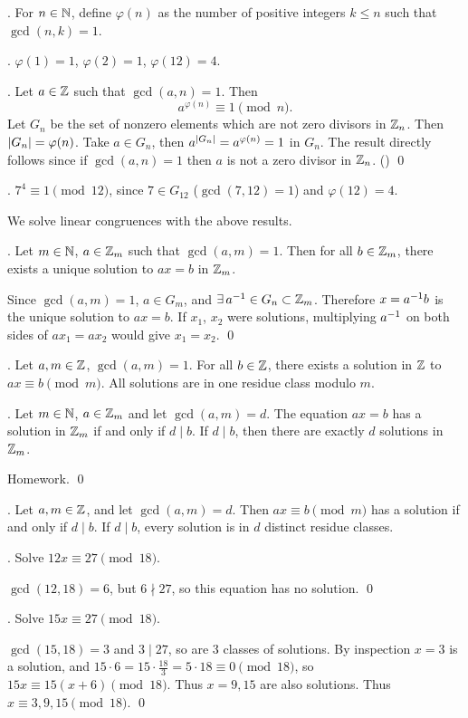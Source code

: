 \pagebreak

.  For \(n \in \mathbb{N}\), define \(\varphi(n)\) as the number of positive integers \(k \leq n\) such that \(\gcd(n, k) = 1\).

\ex. \(\varphi(1) = 1\), \(\varphi(2) = 1\), \(\varphi(12) = 4\).

\thm.  Let \(a \in \mathbb{Z}\) such that \(\gcd(a, n) = 1\). Then
\[
    a^{\varphi(n)} \equiv 1 \pmod n.
\]
\pf Let \(G_n\) be the set of nonzero elements which are not zero divisors in \(\mathbb{Z}_n\). Then \(\left| G_n \right| = \varphi(n)\). Take \(a \in G_n\), then \(a^{\left| G_n \right|} = a^{\varphi(n)} = 1\) in \(G_n\). The result directly follows since if \(\gcd(a, n) = 1\) then \(a\) is not a zero divisor in \(\mathbb{Z}_n\). () \qed

\ex. \(7^4 \equiv 1 \pmod{12}\), since \(7 \in G_{12}\) (\(\gcd(7, 12) = 1\)) and \(\varphi(12) = 4\).

We solve linear congruences with the above results.

\thm. Let \(m \in \mathbb{N}\), \(a \in \mathbb{Z}_m\) such that \(\gcd(a, m) = 1\). Then for all \(b \in \mathbb{Z}_m\), there exists a unique solution to \(ax = b\) in \(\mathbb{Z}_m\).

\pf Since \(\gcd(a, m) = 1\), \(a \in G_m\), and \(\exists a\inv \in G_n \subset \Z_m\). Therefore \(x = a^{-1} b\) is the unique solution to \(ax = b\). If \(x_1\), \(x_2\) were solutions, multiplying \(a^{-1}\) on both sides of \(ax_1 = ax_2\) would give \(x_1 = x_2\). \qed

\cor. Let \(a, m \in \mathbb{Z}\), \(\gcd(a, m) = 1\). For all \(b \in \mathbb{Z}\), there exists a solution in \(\mathbb{Z}\) to \(ax \equiv b \pmod m\). All solutions are in one residue class modulo \(m\).

\thm. Let \(m \in \mathbb{N}\), \(a \in \mathbb{Z}_m\) and let \(\gcd(a, m) = d\). The equation \(ax = b\) has a solution in \(\mathbb{Z}_m\) if and only if \(d \mid b\). If \(d \mid b\), then there are exactly \(d\) solutions in \(\mathbb{Z}_m\).

\pf Homework. \qed

\cor. Let \(a, m \in \mathbb{Z}\), and let \(\gcd(a, m) = d\). Then \(ax \equiv b \pmod m\) has a solution if and only if \(d \mid b\). If \(d \mid b\), every solution is in \(d\) distinct residue classes.

\ex. Solve \(12x \equiv 27 \pmod{18}\).

\pf \(\gcd(12, 18) = 6\), but \(6 \nmid 27\), so this equation has no solution. \qed

\ex. Solve \(15x \equiv 27 \pmod{18}\).

\pf \(\gcd(15, 18) = 3\) and \(3 \mid 27\), so are 3 classes of solutions. By inspection \(x = 3\) is a solution, and \(15 \cdot 6 = 15 \cdot \frac{18}{3} = 5 \cdot 18 \equiv 0 \pmod{18}\), so \(15x \equiv 15(x+6) \pmod{18}\). Thus \(x = 9, 15\) are also solutions. Thus \(x \equiv 3, 9, 15 \pmod{18}\). \qed

\pagebreak
